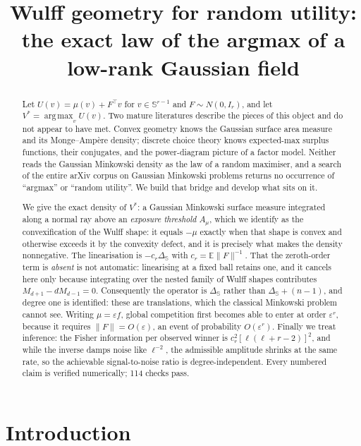 \documentclass[11pt]{article}
\title{Wulff geometry for random utility:\\
the exact law of the argmax of a low-rank Gaussian field}
\author{}
\date{}
\theoremstyle{definition}
\DeclareMathOperator*{\argmax}{arg\,max}
\newcommand{\E}{\mathbb{E}}
\newcommand{\Sph}{\mathbb{S}}
\newcommand{\Lap}{\Delta_{\Sph}}
\begin{document}
\maketitle

\begin{abstract}
Let $U(v)=\mu(v)+F^{\top}v$ for $v\in\Sph^{r-1}$ and $F\sim N(0,I_{r})$, and let
$V^{*}=\argmax_{v}U(v)$. Two mature literatures describe the pieces of this
object and do not appear to have met. Convex geometry knows the Gaussian
surface area measure and its Monge--Amp\`ere density; discrete choice theory
knows expected-max surplus functions, their conjugates, and the power-diagram
picture of a factor model. Neither reads the Gaussian Minkowski density as the
law of a random maximiser, and a search of the entire arXiv corpus on Gaussian
Minkowski problems returns no occurrence of ``argmax'' or ``random utility''.
We build that bridge and develop what sits on it.

We give the exact density of $V^{*}$: a Gaussian Minkowski surface measure
integrated along a normal ray above an \emph{exposure threshold}
$A_{\mu}$, which we identify as the convexification of the Wulff shape: it
equals $-\mu$ exactly when that shape is convex and otherwise exceeds it by the
convexity defect, and it is precisely what makes the density nonnegative. The
linearisation is $-c_{r}\Lap$ with $c_{r}=\E\lVert F\rVert^{-1}$. That the
zeroth-order term is \emph{absent} is not automatic: linearising at a fixed
ball retains one, and it cancels here only because integrating over the nested
family of Wulff shapes contributes $M_{d+1}-dM_{d-1}=0$. Consequently the
operator is $\Lap$ rather than $\Lap+(n-1)$, and degree one is identified:
these are translations, which the classical Minkowski problem cannot see. Writing
$\mu=\varepsilon f$, global competition first becomes able to enter at order
$\varepsilon^{r}$, because it requires $\lVert F\rVert=O(\varepsilon)$, an event
of probability $O(\varepsilon^{r})$. Finally we treat inference: the Fisher
information per observed winner is $c_{r}^{2}[\ell(\ell+r-2)]^{2}$, and while
the inverse damps noise like $\ell^{-2}$, the admissible amplitude shrinks at
the same rate, so the achievable signal-to-noise ratio is degree-independent.
Every numbered claim is verified numerically; 114 checks pass.
\end{abstract}

\section{Introduction}
\end{document}
